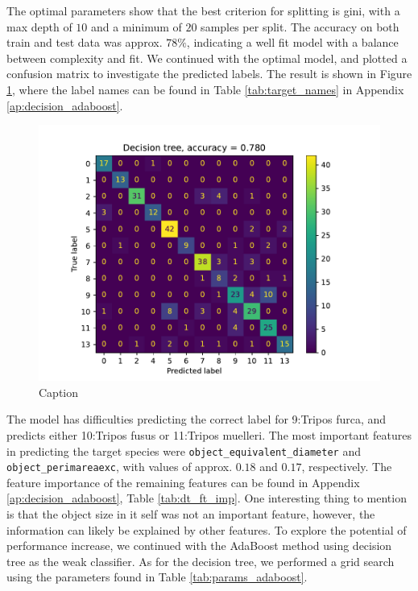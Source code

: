 The optimal parameters show that the best criterion for splitting is gini, with a max depth of $10$ and a minimum of $20$ samples per split. The accuracy on both train and test data was approx. $78\%$, indicating a well fit model with a balance between complexity and fit. 
We continued with the optimal model, and plotted a confusion matrix to investigate the predicted labels. The result is shown in Figure \ref{fig:cm_tree_metadata}, where the label names can be found in Table \ref{tab:target_names} in Appendix \ref{ap:decision_adaboost}.
\begin{figure}
    \centering
    \includegraphics[width=\linewidth]{latex/figures/cm_tree_planktoscope_metadata.pdf}
    \caption{Caption}
    \label{fig:cm_tree_metadata}
\end{figure}
The model has difficulties predicting the correct label for 9:Tripos furca, and predicts either 10:Tripos fusus or 11:Tripos muelleri. The most important features in predicting the target species were \verb|object_equivalent_diameter| and \verb|object_perimareaexc|, with values of approx. $0.18$ and $0.17$, respectively. The feature importance of the remaining features can be found in Appendix \ref{ap:decision_adaboost}, Table \ref{tab:dt_ft_imp}. One interesting thing to mention is that the object size in it self was not an important feature, however, the information can likely be explained by other features.
To explore the potential of performance increase, we continued with the AdaBoost method using decision tree as the weak classifier. As for the decision tree, we performed a grid search using the parameters found in Table \ref{tab:params_adaboost}. 
